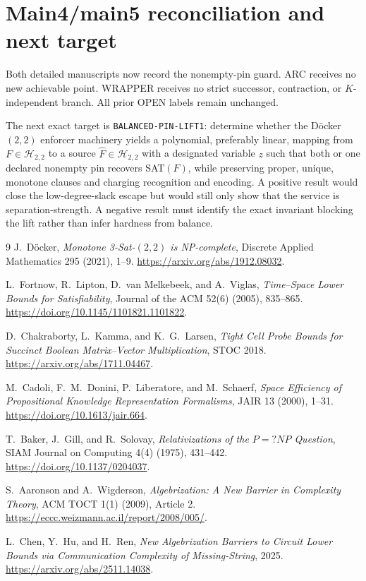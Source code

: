 \documentclass[11pt]{article}
\begin{document}
\section{Main4/main5 reconciliation and next target}

Both detailed manuscripts now record the nonempty-pin guard.  ARC receives
no new achievable point.  WRAPPER receives no strict successor, contraction,
or $K$-independent branch.  All prior OPEN labels remain unchanged.

The next exact target is \texttt{BALANCED-PIN-LIFT1}: determine whether the
D\"ocker $(2,2)$ enforcer machinery yields a polynomial, preferably linear,
mapping from $F\in\mathcal H_{2,2}$ to a source
$\widehat F\in\mathcal H_{2,2}$ with a designated variable $z$ such that
both or one declared nonempty pin recovers SAT$(F)$, while preserving proper,
unique, monotone clauses and charging recognition and encoding.  A positive
result would close the low-degree-slack escape but would still only show that
the service is separation-strength.  A negative result must identify the
exact invariant blocking the lift rather than infer hardness from balance.

\begin{thebibliography}{9}
J.~D\"ocker,
\emph{Monotone 3-Sat-$(2,2)$ is NP-complete},
Discrete Applied Mathematics 295 (2021), 1--9.
\url{https://arxiv.org/abs/1912.08032}.

L.~Fortnow, R.~Lipton, D.~van Melkebeek, and A.~Viglas,
\emph{Time--Space Lower Bounds for Satisfiability},
Journal of the ACM 52(6) (2005), 835--865.
\url{https://doi.org/10.1145/1101821.1101822}.

D.~Chakraborty, L.~Kamma, and K.~G.~Larsen,
\emph{Tight Cell Probe Bounds for Succinct Boolean Matrix--Vector
Multiplication}, STOC 2018.
\url{https://arxiv.org/abs/1711.04467}.

M.~Cadoli, F.~M.~Donini, P.~Liberatore, and M.~Schaerf,
\emph{Space Efficiency of Propositional Knowledge Representation Formalisms},
JAIR 13 (2000), 1--31. \url{https://doi.org/10.1613/jair.664}.

T.~Baker, J.~Gill, and R.~Solovay,
\emph{Relativizations of the $P=?NP$ Question},
SIAM Journal on Computing 4(4) (1975), 431--442.
\url{https://doi.org/10.1137/0204037}.

S.~Aaronson and A.~Wigderson,
\emph{Algebrization: A New Barrier in Complexity Theory},
ACM TOCT 1(1) (2009), Article 2.
\url{https://eccc.weizmann.ac.il/report/2008/005/}.

L.~Chen, Y.~Hu, and H.~Ren,
\emph{New Algebrization Barriers to Circuit Lower Bounds via Communication
Complexity of Missing-String}, 2025.
\url{https://arxiv.org/abs/2511.14038}.
\end{thebibliography}
\end{document}
